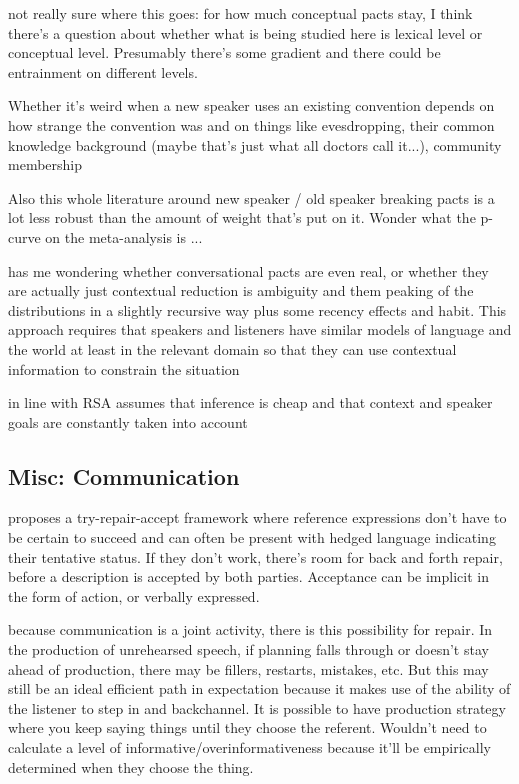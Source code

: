\documentclass[]{article}
\begin{document}
not really sure where this goes: \cite{metzing2003a} for how much conceptual pacts stay, I think there's a question about whether what is being studied here is lexical level or conceptual level. Presumably there's some gradient and there could be entrainment on different levels. 

Whether it's weird when a new speaker uses an existing convention depends on how strange the convention was and on things like evesdropping, their common knowledge background (maybe that's just what all doctors call it...), community membership

Also this whole literature around new speaker / old speaker breaking pacts is a lot less robust than the amount of weight that's put on it. Wonder what the p-curve on the meta-analysis is ... 

\cite{piantadosi2012} has me wondering whether conversational pacts are even real, or whether they are actually just contextual reduction is ambiguity and them peaking of the distributions in a slightly recursive way plus some recency effects and habit. This approach requires that speakers and listeners have similar models of language and the world at least in the relevant domain so that they can use contextual information to constrain the situation 

\cite{piantadosi2012} in line with RSA assumes that inference is cheap and that context and speaker goals are constantly taken into account 

\subsection{Misc: Communication}

\cite{clark1986} proposes a try-repair-accept framework where reference expressions don't have to be certain to succeed and can often be present with hedged language indicating their tentative status. If they don't work, there's room for back and forth repair, before a description is accepted by both parties. Acceptance can be implicit in the form of action, or verbally expressed. 

\cite{clark1986} because communication is a joint activity, there is this possibility for repair. In the production of unrehearsed speech, if planning falls through or doesn't stay ahead of production, there may be fillers, restarts, mistakes, etc. But this may still be an ideal efficient path in expectation because it makes use of the ability of the listener to step in and backchannel. It is possible to have production strategy where you keep saying things until they choose the referent. Wouldn't need to calculate a level of informative/overinformativeness because it'll be empirically determined when they choose the thing. 
\end{document}
